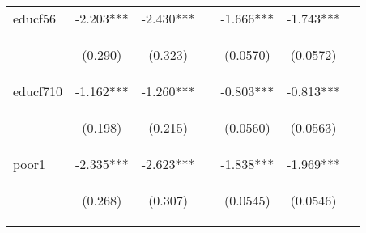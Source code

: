 \documentclass{article}[11pt,subeqn]
\begin{document}
\begin{spacing}{1.25}
\begin{sidewaystable}[!htbp]
\begin{center}
\begin{tabular}{lcccccc}
educf56	&	-2.203***	&	-2.430***	&		&	-1.666***	&	-1.743***	&		\\
\vspace{4pt}	&	 \begin{footnotesize}(0.290) \end{footnotesize}	&	 \begin{footnotesize}(0.323) \end{footnotesize}	&	\begin{footnotesize}\end{footnotesize}	&	 \begin{footnotesize}(0.0570) \end{footnotesize}	&	 \begin{footnotesize}(0.0572) \end{footnotesize}	&	\begin{footnotesize}\end{footnotesize}	\\
educf710	&	-1.162***	&	-1.260***	&		&	-0.803***	&	-0.813***	&		\\
\vspace{4pt}	&	 \begin{footnotesize}(0.198) \end{footnotesize}	&	 \begin{footnotesize}(0.215) \end{footnotesize}	&	\begin{footnotesize}\end{footnotesize}	&	 \begin{footnotesize}(0.0560) \end{footnotesize}	&	 \begin{footnotesize}(0.0563) \end{footnotesize}	&	\begin{footnotesize}\end{footnotesize}	\\
poor1	&	-2.335***	&	-2.623***	&		&	-1.838***	&	-1.969***	&		\\
\vspace{4pt}	&	 \begin{footnotesize}(0.268) \end{footnotesize}	&	 \begin{footnotesize}(0.307) \end{footnotesize}	&	\begin{footnotesize}\end{footnotesize}	&	 \begin{footnotesize}(0.0545) \end{footnotesize}	&	 \begin{footnotesize}(0.0546) \end{footnotesize}	&	\begin{footnotesize}\end{footnotesize}	\\

\end{tabular}
\end{center}
\end{sidewaystable}
\end{spacing}
\end{document}
